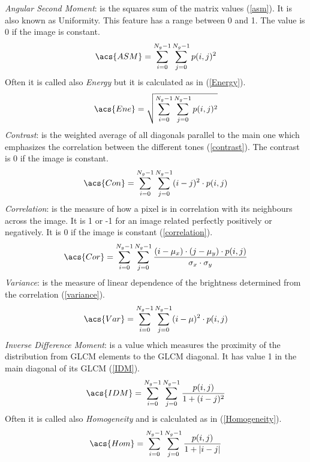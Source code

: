 \documentclass[final,a4paper,12pt,english]{UnicaPhdThesis3}
\begin{document}
	\noindent\textit{Angular Second Moment}: is the squares sum of the matrix values (\ref{asm}). It is also known as Uniformity. This feature has a range between 0 and 1. The value is 0 if the image is constant.\\
	\begin{equation}\label{asm}
	\acs{ASM}=\sum_{i=0}^{N_{g}-1}\sum_{j=0}^{N_{g}-1}p(i,j)^2
	\end{equation}
	Often it is called also \textit{Energy} but it is calculated as in (\ref{Energy}).
	\begin{equation}\label{Energy}
	\acs{Ene}=\sqrt{\sum_{i=0}^{N_{g}-1}\sum_{j=0}^{N_{g}-1}p(i,j)^2}
	\end{equation}
	\textit{Contrast}: is the weighted average of all diagonals parallel to the main one which emphasizes the correlation between the different tones (\ref{contrast}). The contrast is 0 if the image is constant.
	\begin{equation}\label{contrast}
	\acs{Con}=\sum_{i=0}^{N_{g}-1}\sum_{j=0}^{N_{g}-1} (i-j)^2 \cdot p(i,j)
	\end{equation}
	\textit{Correlation}: is the measure of how a pixel is in correlation with its neighbours across the image. It is 1 or -1 for an image related perfectly positively or negatively. It is 0 if the image is constant (\ref{correlation}).
	\begin{equation}\label{correlation}
	\acs{Cor}=\sum_{i=0}^{N_{g}-1}\sum_{j=0}^{N_{g}-1}  \frac{(i-\mu_x) \cdot (j-\mu_y) \cdot p(i,j)}{\sigma_x \cdot \sigma_y}
	\end{equation}
	\textit{Variance}: is the measure of linear dependence of the brightness determined from the correlation (\ref{variance}).
	\begin{equation}\label{variance}
	\acs{Var}=\sum_{i=0}^{N_{g}-1}\sum_{j=0}^{N_{g}-1}(i-\mu)^2 \cdot p(i,j)
	\end{equation}
	\textit{Inverse Difference Moment}: is a value which measures the proximity of the distribution from GLCM elements to the GLCM diagonal. It has value 1 in the main diagonal of its GLCM (\ref{IDM}).
	\begin{equation}\label{IDM}
	\acs{IDM}=\sum_{i=0}^{N_{g}-1}\sum_{j=0}^{N_{g}-1}\frac{p(i,j)}{1 + (i-j)^2}
	\end{equation}
	Often it is called also \textit{Homogeneity} and is calculated as in (\ref{Homogeneity}).
	\begin{equation}\label{Homogeneity}
	\acs{Hom}=\sum_{i=0}^{N_{g}-1}\sum_{j=0}^{N_{g}-1}\frac{p(i,j)}{1 + |i-j|}
	\end{equation}
\end{document}

